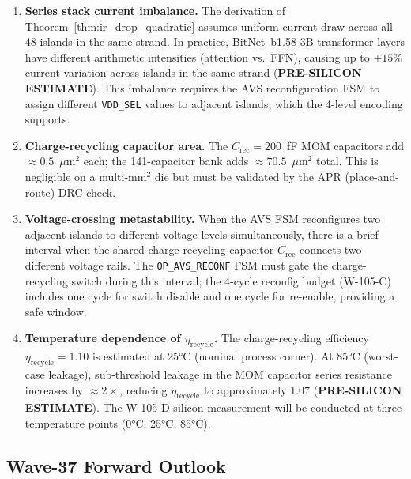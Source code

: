 \begin{enumerate}
  \item \textbf{Series stack current imbalance.}
    The derivation of Theorem~\ref{thm:ir_drop_quadratic} assumes
    uniform current draw across all 48 islands in the same strand.
    In practice, BitNet~b1.58-3B transformer layers have different
    arithmetic intensities (attention vs.\ FFN), causing up to
    $\pm 15$\% current variation across islands in the same strand
    (\textbf{PRE-SILICON ESTIMATE}).  This imbalance requires the
    AVS reconfiguration FSM to assign different \texttt{VDD\_SEL}
    values to adjacent islands, which the 4-level encoding supports.

  \item \textbf{Charge-recycling capacitor area.}
    The $C_\mathrm{rec} = 200$~fF MOM capacitors add $\approx 0.5$~$\mu$m$^2$
    each; the 141-capacitor bank adds $\approx 70.5$~$\mu$m$^2$ total.
    This is negligible on a multi-mm$^2$ die but must be validated by
    the APR (place-and-route) DRC check.

  \item \textbf{Voltage-crossing metastability.}
    When the AVS FSM reconfigures two adjacent islands to different
    voltage levels simultaneously, there is a brief interval when the
    shared charge-recycling capacitor $C_\mathrm{rec}$ connects two
    different voltage rails.  The \texttt{OP\_AVS\_RECONF} FSM must
    gate the charge-recycling switch during this interval; the 4-cycle
    reconfig budget (W-105-C) includes one cycle for switch disable and
    one cycle for re-enable, providing a safe window.

  \item \textbf{Temperature dependence of $\eta_\mathrm{recycle}$.}
    The charge-recycling efficiency $\eta_\mathrm{recycle} = 1.10$
    is estimated at 25°C (nominal process corner).  At 85°C (worst-case
    leakage), sub-threshold leakage in the MOM capacitor series resistance
    increases by $\approx 2\times$, reducing $\eta_\mathrm{recycle}$ to
    approximately 1.07 (\textbf{PRE-SILICON ESTIMATE}).  The W-105-D
    silicon measurement will be conducted at three temperature points
    (0°C, 25°C, 85°C).
\end{enumerate}

\subsection{Wave-37 Forward Outlook}

